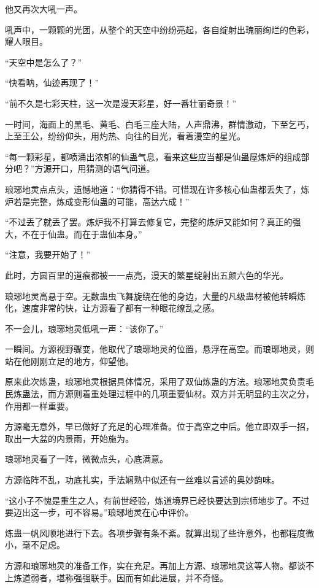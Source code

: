 \begin{this_body}
他又再次大吼一声。

吼声中，一颗颗的光团，从整个的天空中纷纷亮起，各自绽射出瑰丽绚烂的色彩，耀人眼目。

“天空中是怎么了？”

“快看呐，仙迹再现了！”

“前不久是七彩天柱，这一次是漫天彩星，好一番壮丽奇景！”

一时间，海面上的黑毛、黄毛、白毛三座大陆，人声鼎沸，群情激动，下至乞丐，上至王公，纷纷仰头，用灼热、向往的目光，看着漫空的星光。

“每一颗彩星，都喷涌出浓郁的仙蛊气息，看来这些应当都是仙蛊屋炼炉的组成部分吧？”方源开口，用猜测的语气问道。

琅琊地灵点点头，遗憾地道：“你猜得不错。可惜现在许多核心仙蛊都丢失了，炼炉若是完整，炼成变形仙蛊的可能，高达六成！”

“不过丢了就丢了罢。炼炉我不打算去修复它，完整的炼炉又能如何？真正的强大，不在于仙蛊。而在于蛊仙本身。”

“注意，我要开始了！”

此时，方圆百里的道痕都被一一点亮，漫天的繁星绽射出五颜六色的华光。

琅琊地灵高悬于空。无数蛊虫飞舞旋绕在他的身边，大量的凡级蛊材被他转瞬炼化，速度非常的快，让方源看了都有一种眼花缭乱之感。

不一会儿，琅琊地灵低吼一声：“该你了。”

一瞬间。方源视野骤变，他取代了琅琊地灵的位置，悬浮在高空。而琅琊地灵，则站在他刚刚立足的地方，仰望他。

原来此次炼蛊，琅琊地灵根据具体情况，采用了双仙炼蛊的方法。琅琊地灵负责毛民炼蛊法，而方源则着重处理过程中的几项重要仙材。双方并无明显的主次之分，作用都一样重要。

方源毫无意外，早已做好了充足的心理准备。位于高空之中后。他立即双手一招，取出一大盆的内景雨，开始施为。

琅琊地灵看了一阵，微微点头，心底满意。

方源临阵不乱，功底扎实，手法娴熟中似还有一丝难以言述的奥妙韵味。

“这小子不愧是重生之人，有前世经验，炼道境界已经快要达到宗师地步了。不过要迈出这一步，可不容易。”琅琊地灵在心中评价。

炼蛊一帆风顺地进行下去。各项步骤有条不紊。就算出现了些许意外，也都程度微小，毫不足虑。

方源和琅琊地灵的准备工作，实在充足。再加上方源、琅琊地灵这等人物。都谈不上炼道弱者，堪称强强联手。因而有如此进展，并不奇怪。


\end{this_body}
